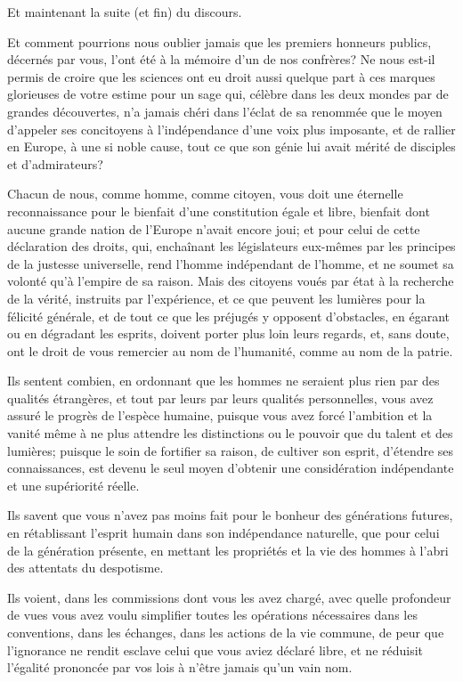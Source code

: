 Et maintenant la suite (et fin) du discours.
%
\begin{displayquote}[p.~27]
  Et comment pourrions nous oublier jamais que les premiers honneurs
  publics, décernés par vous, l'ont été à la mémoire d'un de nos
  confrères? Ne nous est-il permis de croire que les sciences ont eu
  droit aussi quelque part à ces marques glorieuses de votre estime
  pour un sage qui, célèbre dans les deux mondes par de grandes
  découvertes, n'a jamais chéri dans l'éclat de sa renommée que le
  moyen d'appeler ses concitoyens à l'indépendance d'une voix plus
  imposante, et de rallier en Europe, à une si noble cause, tout ce
  que son génie lui avait mérité de disciples et d'admirateurs?

  Chacun de nous, comme homme, comme citoyen, vous doit une éternelle
  reconnaissance pour le bienfait d'une constitution égale et libre,
  bienfait dont aucune grande nation de l'Europe n'avait encore joui;
  et pour celui de cette déclaration des droits, qui, enchaînant les
  législateurs eux-mêmes par les principes de la justesse universelle,
  rend l'homme indépendant de l'homme, et ne soumet sa volonté qu'à
  l'empire de sa raison.  Mais des citoyens voués par état à la
  recherche de la vérité, instruits par l'expérience, et ce que
  peuvent les lumières pour la félicité générale, et de tout ce que
  les préjugés y opposent d'obstacles, en égarant ou en dégradant les
  esprits, doivent porter plus loin leurs regards, et, sans doute, ont
  le droit de vous remercier au nom de l'humanité, comme au nom de la
  patrie.

  Ils sentent combien, en ordonnant que les hommes ne seraient plus
  rien par des qualités étrangères, et tout par leurs par leurs
  qualités personnelles, vous avez assuré le progrès de l'espèce
  humaine, puisque vous avez forcé l'ambition et la vanité même à ne
  plus attendre les distinctions ou le pouvoir que du talent et des
  lumières; puisque le soin de fortifier sa raison, de cultiver son
  esprit, d'étendre ses connaissances, est devenu le seul moyen
  d'obtenir une considération indépendante et une supériorité réelle.

  Ils savent que vous n'avez pas moins fait pour le bonheur des
  générations futures, en rétablissant l'esprit humain dans son
  indépendance naturelle, que pour celui de la génération présente, en
  mettant les propriétés et la vie des hommes à l'abri des attentats
  du despotisme.

  Ils voient, dans les commissions dont vous les avez chargé, avec
  quelle profondeur de vues vous avez voulu simplifier toutes les
  opérations nécessaires dans les conventions, dans les échanges, dans
  les actions de la vie commune, de peur que l'ignorance ne rendit
  esclave celui que vous aviez déclaré libre, et ne réduisit l'égalité
  prononcée par vos lois à n'être jamais qu'un vain nom.


\end{displayquote}
